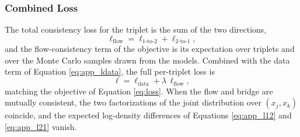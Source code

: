 \subsubsection{Combined Loss}

The total consistency loss for the triplet is the sum of the two directions,
\begin{equation}
    \label{eq:app_ltriplet}
    \ell_\mathrm{flow} = \ell_{1\text{-}\mathrm{to}\text{-}2} + \ell_{2\text{-}\mathrm{to}\text{-}1},
\end{equation}
and the flow-consistency term of the objective is its expectation over triplets and over the Monte Carlo samples drawn from the models. Combined with the data term of Equation \ref{eq:app_ldata}, the full per-triplet loss is
\begin{equation}
    \label{eq:app_full}
    \ell = \ell_\mathrm{data} + \lambda\,\ell_\mathrm{flow},
\end{equation}
matching the objective of Equation \ref{eq:loss}. When the flow and bridge are mutually consistent, the two factorizations of the joint distribution over $(x_j, x_k)$ coincide, and the expected log-density differences of Equations \ref{eq:app_l12} and \ref{eq:app_l21} vanish.